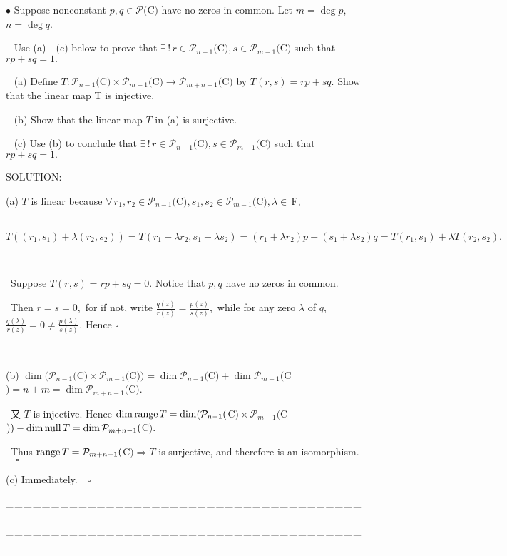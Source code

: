 \documentclass[a4paper, 11pt, UTF8]{article}
\def\range{\textup{range}\,}
\def\null{\textup{null\,}}
\def\Po{\mathcal{P}}
\def\Fbfc{$\,{\timesbf F}$}
\begin{document}
\begin{large}
{\small $\bullet$} {\timessl\Large 
Suppose nonconstant $p,q\in\Po(${\timesbf C}$)$ have no zeros in common. Let $m = \deg p$, $n = \deg q$.}\par\,\,\,
{\timessl\Large Use {\timesnr(a)—(c)} below to prove that $\exists\,!\,r\in\Po_{n-1}(${\timesbf C}$),s\in\Po_{m-1}(${\timesbf C}$)$ such that $rp + sq = 1.$}\par\,\,\,
(a) {\timessl Define $T:\Po_{n-1}(${\timesbf C}$) \times \Po_{m-1}(${\timesbf C}$)\rightarrow\Po_{m+n-1}(${\timesbf C}$)$ by $T(r, s) = rp + sq.$
Show that the linear map T is injective.
}\par\,\,\,
(b) {\timessl Show that the linear map $T$ in {\timesnr(a)} is surjective.}\par\,\,\,
(c) {\timessl Use {\timesnr(b)} to conclude that $\exists\,!\,r\in\Po_{n-1}(${\timesbf C}$),s\in\Po_{m-1}(${\timesbf C}$)$ such that $rp + sq = 1.$}\par
{\timesbf S\footnotesize{OLUTION:}}\par\quad
(a) $T$ is linear because $\forall\,r_1,r_2\in\Po_{n-1}(${\timesbf C}$),s_1,s_2\in\Po_{m-1}(${\timesbf C}$),\lambda\in\Fbfc,$\par\qquad\,
$T((r_1,s_1)+\lambda(r_2,s_2))=T(r_1+\lambda r_2,s_1+\lambda s_2)=(r_1+\lambda r_2)p+(s_1+\lambda s_2)q=T(r_1,s_1)+\lambda T(r_2,s_2).$\par{\tiny\,\par}\qquad\,
Suppose $T(r,s)=rp+sq=0.$ Notice that $p,q$ have no zeros in common.\par\qquad\,
Then $r=s=0,$ for if not, write $\displaystyle\frac{q(z)}{r(z)}=\frac{p(z)}{s(z)},$ while for any zero $\lambda$ of $q$, $\displaystyle\frac{q(\lambda)}{r(z)}=0\neq\frac{p(\lambda)}{s(z)}.$ Hence $\square$\par{\tiny\,\par}\quad
(b) $\dim(\Po_{n-1}(${\timesbf C}$)\times\Po_{m-1}(${\timesbf C}$))=\dim\Po_{n-1}(${\timesbf C}$)+\dim\Po_{m-1}(${\timesbf C}$)=n+m=\dim\Po_{m+n-1}(${\timesbf C}$).$\par\qquad\,
又 $T$ is injective. Hence $\dim\range T=\dim(\Po_{n-1}(${\timesbf C}$)\times\Po_{m-1}(${\timesbf C}$))-\dim\null T=\dim\Po_{m+n-1}(${\timesbf C}$).$\par\qquad\,
Thus $\range T=\Po_{m+n-1}(${\timesbf C}$)\Rightarrow T$ is surjective, and therefore is an isomorphism.$\quad\square$\par\quad
(c) Immediately.$\quad\square$\par
{\tiny \_\,\_\,\_\,\_\,\_\,\_\,\_\,\_\,\_\,\_\,\_\,\_\,\_\,\_\,\_\,\_\,\_\,\_\,\_\,\_\,\_\,\_\,\_\,\_\,\_\,\_\,\_\,\_\,\_\,\_\,\_\,\_\,\_\,\_\,\_\,\_\,\_\,\_\,\_\,\_\,\_\,\_\,\_\,\_\,\_\,\_\,\_\,\_\,\_\,\_\,\_\,\_\,\_\,\_\,\_\,\_\,\_\,\_\,\_\,\_\,\_\,\_\,\_\,\_\,\_\,\_\,\_\,\_\,\_\,\_\,\_\_\,\_\,\_\,\_\,\_\,\_\,\_\,\_\,\_\,\_\,\_\,\_\,\_\,\_\,\_\,\_\,\_\,\_\,\_\,\_\,\_\,\_\,\_\,\_\,\_\,\_\,\_\,\_\,\_\,\_\,\_\,\_\,\_\,\_\,\_\,\_\,\_\,\_\,\_\,\_\,\_\,\_\,\_\,\_\,\_\,\_\,\_\,\_\,\_\,\_\,\_\,\_\,\_\,\_\,\_\,\_\,\_\,\_\,\_\,\_\,\_\,\_\,\_\,\_\,\_\,\_\,\_\,\_\,\_\,\_\,\_}\par


\end{large}
\end{document}

